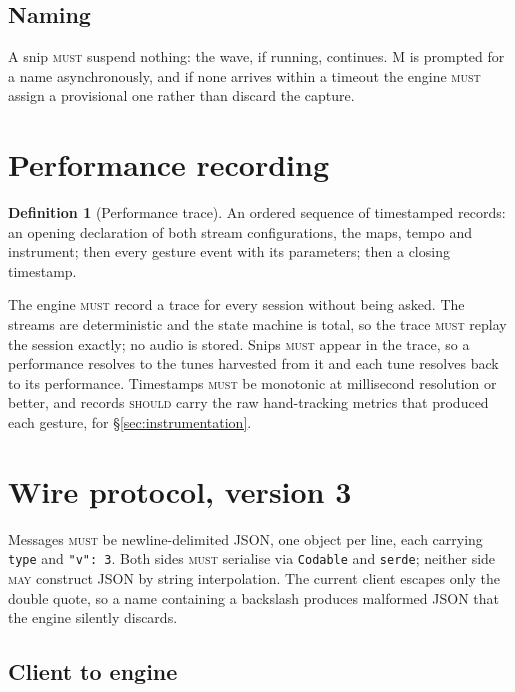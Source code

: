 \documentclass[11pt,a4paper]{article}
\newcommand{\MUST}{\textsc{must}}
\newcommand{\SHOULD}{\textsc{should}}
\newcommand{\MAY}{\textsc{may}}
\theoremstyle{definition}
\newtheorem{definition}{Definition}
\theoremstyle{plain}
\theoremstyle{remark}
\begin{document}
\subsection{Naming}

A snip \MUST{} suspend nothing: the wave, if running, continues. M is prompted for a name
asynchronously, and if none arrives within a timeout the engine \MUST{} assign a provisional one
rather than discard the capture.

\section{Performance recording}

\begin{definition}[Performance trace]
An ordered sequence of timestamped records: an opening declaration of both stream configurations,
the maps, tempo and instrument; then every gesture event with its parameters; then a closing
timestamp.
\end{definition}

The engine \MUST{} record a trace for every session without being asked. The streams are
deterministic and the state machine is total, so the trace \MUST{} replay the session exactly; no
audio is stored. Snips \MUST{} appear in the trace, so a performance resolves to the tunes harvested
from it and each tune resolves back to its performance. Timestamps \MUST{} be monotonic at
millisecond resolution or better, and records \SHOULD{} carry the raw hand-tracking metrics that
produced each gesture, for \S\ref{sec:instrumentation}.

\section{Wire protocol, version 3}
\label{sec:protocol}

Messages \MUST{} be newline-delimited JSON, one object per line, each carrying \texttt{type} and
\texttt{"v": 3}. Both sides \MUST{} serialise via \texttt{Codable} and \texttt{serde}; neither side
\MAY{} construct JSON by string interpolation. The current client escapes only the double quote, so
a name containing a backslash produces malformed JSON that the engine silently discards.

\subsection{Client to engine}
\end{document}
